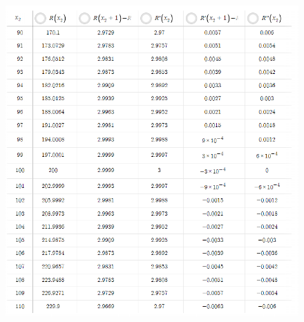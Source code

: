 \begin{figure}[H]
    \centering
    \caption{} 
    \includegraphics[scale=1.9]{images/2ndDervConcavity/diminishingReturn_ex1_table2.PNG} 

\end{figure}
\newpage
